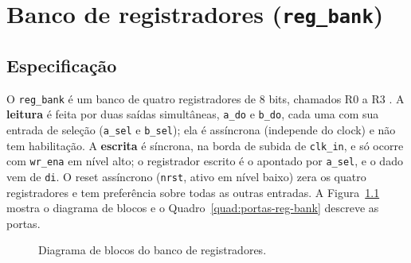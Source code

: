 \chapter{Banco de registradores (\texttt{reg\_bank})}
\label{cap:reg_bank}

\section{Especificação}

O \texttt{reg\_bank} é um banco de quatro registradores de 8 bits, chamados R0 a R3 \cite{tp2}. A \textbf{leitura} é feita por duas saídas simultâneas, \texttt{a\_do} e \texttt{b\_do}, cada uma com sua entrada de seleção (\texttt{a\_sel} e \texttt{b\_sel}); ela é assíncrona (independe do clock) e não tem habilitação. A \textbf{escrita} é síncrona, na borda de subida de \texttt{clk\_in}, e só ocorre com \texttt{wr\_ena} em nível alto; o registrador escrito é o apontado por \texttt{a\_sel}, e o dado vem de \texttt{di}. O reset assíncrono (\texttt{nrst}, ativo em nível baixo) zera os quatro registradores e tem preferência sobre todas as outras entradas. A Figura~\ref{fig:bloco-reg-bank} mostra o diagrama de blocos e o Quadro~\ref{quad:portas-reg-bank} descreve as portas.

\begin{figure}[htb]
\caption{Diagrama de blocos do banco de registradores.}\label{fig:bloco-reg-bank}
\centering
{}
\end{figure}

